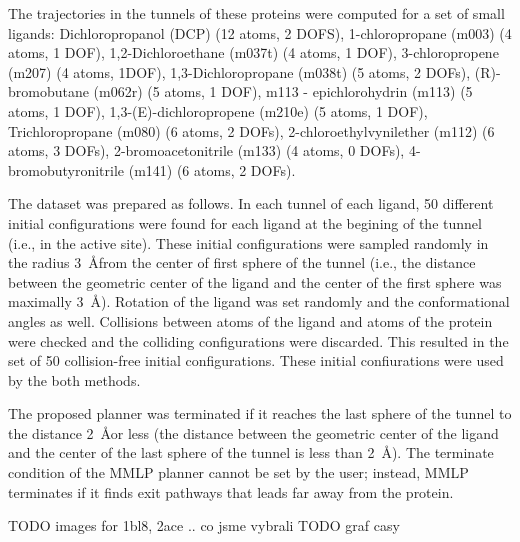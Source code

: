 \documentclass{bmcart}
\begin{document}
The trajectories in the tunnels of these proteins were computed for a set of small ligands:
Dichloropropanol (DCP) (12 atoms, 2 DOFS),
1-chloropropane (m003) (4 atoms, 1 DOF),
1,2-Dichloroethane (m037t) (4 atoms, 1 DOF),
3-chloropropene (m207) (4 atoms, 1DOF),
1,3-Dichloropropane (m038t) (5 atoms, 2 DOFs),
(R)-bromobutane (m062r) (5 atoms, 1 DOF),
m113 - epichlorohydrin (m113) (5 atoms, 1 DOF),
1,3-(E)-dichloropropene (m210e) (5 atoms, 1 DOF),
Trichloropropane (m080) (6 atoms, 2 DOFs),
2-chloroethylvynilether (m112) (6 atoms, 3 DOFs),
2-bromoacetonitrile (m133) (4 atoms, 0 DOFs),
4-bromobutyronitrile (m141) (6 atoms, 2 DOFs).



The dataset was prepared as follows.
In each tunnel of each ligand, 50 different initial configurations were found for each ligand at the begining of the tunnel (i.e., in the active site).
These initial configurations were sampled randomly in the radius 3~\AA from the center of first sphere of the tunnel 
(i.e., the distance between the geometric center of the ligand and the center of the first sphere was maximally 3~\AA).
Rotation of the ligand was set randomly and the conformational angles as well.
Collisions between atoms of the ligand and atoms of the protein were checked and the colliding configurations were discarded.
This resulted in the set of 50 collision-free initial configurations.
These initial confiurations were used by the both methods.

The proposed planner was terminated if it reaches the last sphere of the tunnel to the distance 2~\AA or less (the distance between the 
        geometric center of the ligand and the center of the last sphere of the tunnel is less than 2~\AA).
The terminate condition of the MMLP planner cannot be set by the user; instead, MMLP terminates if it finds exit pathways that leads far away from the protein.


TODO images for 1bl8, 2ace .. co jsme vybrali
TODO graf casy
\end{document}
